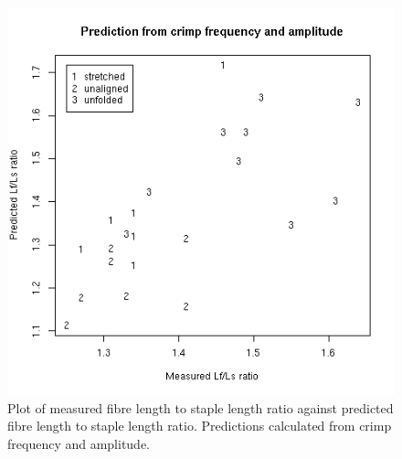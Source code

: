 %

\begin{figure}[!h]
  \centering
  \includegraphics[width=1.0\textwidth]{figpfarat.png}
  \caption{Plot of measured fibre length to staple length ratio against predicted fibre length to staple length ratio. Predictions calculated from crimp frequency and amplitude.}
  \label{fig:pfarat}
\end{figure}

%

